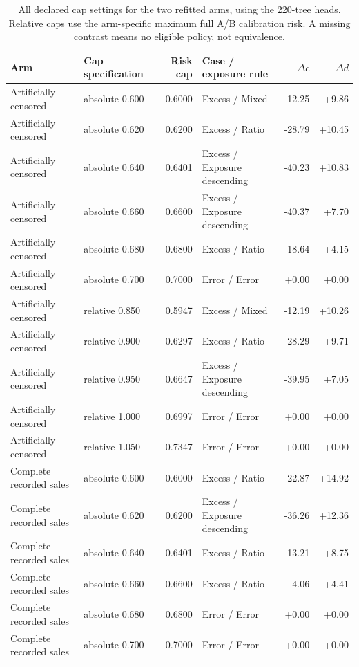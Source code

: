 \begin{table}[t]\centering\scriptsize
\caption{All declared cap settings for the two refitted arms, using the 220-tree heads. Relative caps use the arm-specific maximum full A/B calibration risk. A missing contrast means no eligible policy, not equivalence.}\label{tab:matched-caps}
\begin{tabular}{llrlrr}\toprule
Arm & Cap specification & Risk cap & Case / exposure rule & $\Delta c$ & $\Delta d$\\\midrule
Artificially censored & absolute 0.600 & 0.6000 & Excess / Mixed & -12.25 & +9.86 \\
Artificially censored & absolute 0.620 & 0.6200 & Excess / Ratio & -28.79 & +10.45 \\
Artificially censored & absolute 0.640 & 0.6401 & Excess / Exposure descending & -40.23 & +10.83 \\
Artificially censored & absolute 0.660 & 0.6600 & Excess / Exposure descending & -40.37 & +7.70 \\
Artificially censored & absolute 0.680 & 0.6800 & Excess / Ratio & -18.64 & +4.15 \\
Artificially censored & absolute 0.700 & 0.7000 & Error / Error & +0.00 & +0.00 \\
Artificially censored & relative 0.850 & 0.5947 & Excess / Mixed & -12.19 & +10.26 \\
Artificially censored & relative 0.900 & 0.6297 & Excess / Ratio & -28.29 & +9.71 \\
Artificially censored & relative 0.950 & 0.6647 & Excess / Exposure descending & -39.95 & +7.05 \\
Artificially censored & relative 1.000 & 0.6997 & Error / Error & +0.00 & +0.00 \\
Artificially censored & relative 1.050 & 0.7347 & Error / Error & +0.00 & +0.00 \\
Complete recorded sales & absolute 0.600 & 0.6000 & Excess / Ratio & -22.87 & +14.92 \\
Complete recorded sales & absolute 0.620 & 0.6200 & Excess / Exposure descending & -36.26 & +12.36 \\
Complete recorded sales & absolute 0.640 & 0.6401 & Excess / Ratio & -13.21 & +8.75 \\
Complete recorded sales & absolute 0.660 & 0.6600 & Excess / Ratio & -4.06 & +4.41 \\
Complete recorded sales & absolute 0.680 & 0.6800 & Error / Error & +0.00 & +0.00 \\
Complete recorded sales & absolute 0.700 & 0.7000 & Error / Error & +0.00 & +0.00 \\

\end{tabular}
\end{table}
